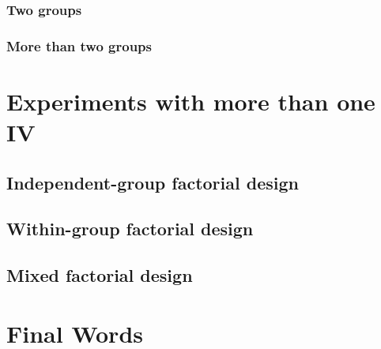 \documentclass[
]{book}
\begin{document}
\hypertarget{two-groups-1}{%
\subsection{Two groups}\label{two-groups-1}}

\hypertarget{more-than-two-groups-1}{%
\subsection{More than two groups}\label{more-than-two-groups-1}}

\hypertarget{experiments-with-more-than-one-iv}{%
\chapter{Experiments with more than one IV}\label{experiments-with-more-than-one-iv}}

\hypertarget{independent-group-factorial-design}{%
\section{Independent-group factorial design}\label{independent-group-factorial-design}}

\hypertarget{within-group-factorial-design}{%
\section{Within-group factorial design}\label{within-group-factorial-design}}

\hypertarget{mixed-factorial-design}{%
\section{Mixed factorial design}\label{mixed-factorial-design}}

\hypertarget{final-words}{%
\chapter{Final Words}\label{final-words}}

  
\end{document}
